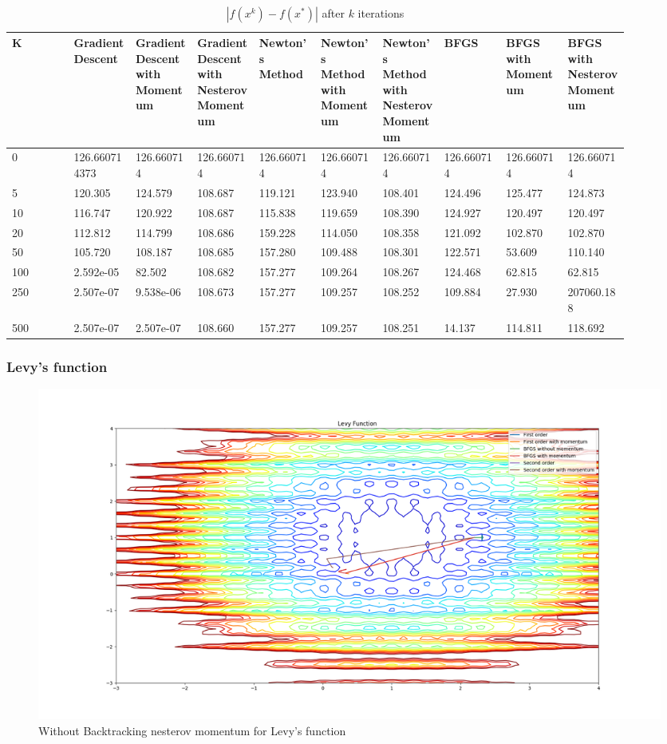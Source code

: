 \documentclass{article}
\begin{document}
\begin{table}[H]
	\centering
	\caption{$ | f(x^k) - f(x^*) | $ after $k$ iterations}
	\label{Bird's function table}
	\begin{tabular}{|l|p{0.1\linewidth}|p{0.1\linewidth}|p{0.1\linewidth}|p{0.1\linewidth}|p{0.1\linewidth}|p{0.1\linewidth}|p{0.1\linewidth}|p{0.1\linewidth}|p{0.1\linewidth}|}
		\hline
		K & Gradient Descent & Gradient Descent with Momentum & Gradient Descent with Nesterov Momentum & Newton's Method & Newton's Method with Momentum & Newton's Method with Nesterov Momentum & BFGS & BFGS with Momentum & BFGS with Nesterov Momentum \\
		\hline
		0 & 126.660714373 & 126.660714 & 126.660714 & 126.660714 & 126.660714 & 126.660714 & 126.660714 & 126.660714 & 126.660714 \\
		\hline
		5 & 120.305 & 124.579 & 108.687 & 119.121 & 123.940 & 108.401 & 124.496 & 125.477 & 124.873 \\
		\hline
		10 & 116.747 & 120.922 & 108.687 & 115.838 & 119.659 & 108.390 & 124.927 & 120.497 & 120.497 \\
		\hline
		20 & 112.812 & 114.799 & 108.686 & 159.228 & 114.050 & 108.358 & 121.092 & 102.870 & 102.870 \\
		\hline
		50 & 105.720 & 108.187 & 108.685 & 157.280 & 109.488 & 108.301 & 122.571 & 53.609 & 110.140 \\
		\hline
		100 & 2.592e-05 & 82.502 & 108.682 & 157.277 & 109.264 & 108.267 & 124.468 & 62.815 & 62.815 \\
		\hline
		250 & 2.507e-07 & 9.538e-06 & 108.673 & 157.277 & 109.257 & 108.252 & 109.884 & 27.930 & 207060.188 \\
		\hline
		500 & 2.507e-07 & 2.507e-07 & 108.660 & 157.277 & 109.257 & 108.251 & 14.137 & 114.811 & 118.692 \\
		\hline
	\end{tabular}
\end{table}

\subsubsection{Levy's function}

\begin{figure}[H]
	\includegraphics[width=\linewidth]{../Images/levynesterov.png}
	\caption{Without Backtracking nesterov momentum for Levy's function}
	\label{fig:Without Backtracking nesterov momentum for Levy's function}
\end{figure}
\end{document}
